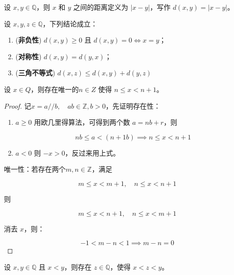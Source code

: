 \begin{definition}[距离]
	设 $x,y\in \mathbb Q$，则 $x$ 和 $y$ 之间的距离定义为 $|x-y|$，写作 $d(x,y)=|x-y|$。
\end{definition}

\begin{theorem}[距离的基本性质]
	设 $x,y,z\in \mathbb Q$，下列结论成立：
	\begin{enumerate}
		\item (\textbf{非负性}) $d(x,y)\ge 0$ 且 $d(x,y)=0\iff x=y$；
		\item (\textbf{对称性}) $d(x,y) = d(y,x)$；
		\item (\textbf{三角不等式}) $d(x,z) \le d(x,y) + d(y,z)$
	\end{enumerate}
\end{theorem}

\begin{theorem}
	设 $x\in Q$，则存在唯一的$n\in Z$ 使得 $n\le x < n+1$。
\end{theorem}

\begin{proof} 记$x = a//b,\quad ab\in\mathbb Z,b>0$，先证明存在性：
\begin{enumerate}
	\item $a\ge 0$ 用欧几里得算法，可得到两个数 $a=nb+r$，则
	
	$$
	nb \le a < (n+1b)\implies n\le x < n+1
	$$
	\item $a < 0$ 则 $-x > 0$，反过来用上式。
\end{enumerate}	

\noindent 唯一性：若存在两个$m,n\in \mathbb Z$，满足

$$
m\le x < m+1, \quad n\le x < n+1
$$

\noindent 则

$$
m \le x < n+1, \quad n \le x < m+1
$$

\noindent 消去 $x$，则：

$$
-1<m-n<1\implies m-n=0
$$
\end{proof}

\begin{theorem}
	设 $x,y\in \mathbb Q$ 且 $x < y$，则存在 $z\in \mathbb Q$，使得 $x<z<y$。
\end{theorem}





















